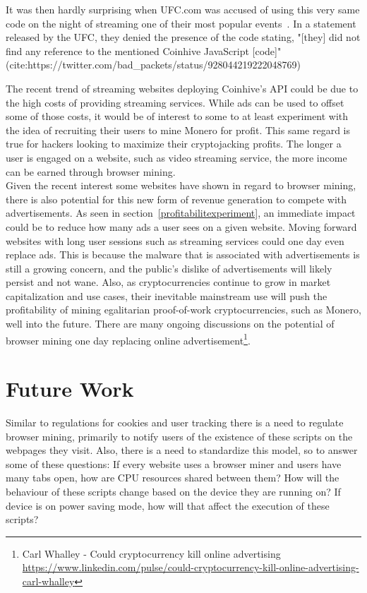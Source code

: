 It was then hardly surprising when UFC.com was accused of using this very same code on the night of streaming one of their most popular events~\cite{registerufcmonero}. In a statement released by the UFC, they denied the presence of the code stating, "[they] did not find any reference to the mentioned Coinhive JavaScript [code]" (cite:https://twitter.com/bad_packets/status/928044219222048769)

The recent trend of streaming websites deploying Coinhive's API could be due to the high costs of providing streaming services. While ads can be used to offset some of those costs, it would be of interest to some to at least experiment with the idea of recruiting their users to mine Monero for profit. This same regard is true for hackers looking to maximize their cryptojacking profits. The longer a user is engaged on a website, such as video streaming service, the more income can be earned through browser mining.
\\
Given the recent interest some websites have shown in regard to browser mining, there is also potential for this new form of revenue generation to compete with advertisements. As seen in section~\ref{profitabilitexperiment}, an immediate impact could be to reduce how many ads a user sees on a given website. Moving forward websites with long user sessions such as streaming services could one day even replace ads. This is because the malware that is associated with advertisements is still a growing concern, and the public's dislike of advertisements will likely persist and not wane. Also, as cryptocurrencies continue to grow in market capitalization and use cases, their inevitable mainstream use will push the profitability of mining egalitarian proof-of-work cryptocurrencies, such as Monero, well into the future. There are many ongoing discussions on the potential of browser mining one day replacing online advertisement\footnote{Carl Whalley - Could cryptocurrency kill online advertising \url{https://www.linkedin.com/pulse/could-cryptocurrency-kill-online-advertising-carl-whalley}}.

\section{Future Work}
Similar to regulations for cookies and user tracking there is a need to regulate browser mining, primarily to notify users of the existence of these scripts on the webpages they visit. Also, there is a need to standardize this model, so to answer some of these questions: If every website uses a browser miner and users have many tabs open, how are CPU resources shared between them? How will the behaviour of these scripts change based on the device they are running on? If device is on power saving mode, how will that affect the execution of these scripts?

